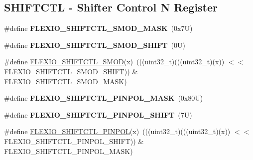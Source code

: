 \subsection*{S\+H\+I\+F\+T\+C\+TL -\/ Shifter Control N Register}
\begin{DoxyCompactItemize}
\item 
\mbox{\label{group___f_l_e_x_i_o___register___masks_ga7585d1e553b36c88156cba2bcfd17c80}} 
\#define {\bfseries F\+L\+E\+X\+I\+O\+\_\+\+S\+H\+I\+F\+T\+C\+T\+L\+\_\+\+S\+M\+O\+D\+\_\+\+M\+A\+SK}~(0x7\+U)
\item 
\mbox{\label{group___f_l_e_x_i_o___register___masks_ga18bd719621dccd6e0e31ea3ae2aca7ca}} 
\#define {\bfseries F\+L\+E\+X\+I\+O\+\_\+\+S\+H\+I\+F\+T\+C\+T\+L\+\_\+\+S\+M\+O\+D\+\_\+\+S\+H\+I\+FT}~(0\+U)
\item 
\#define \mbox{\hyperlink{group___f_l_e_x_i_o___register___masks_ga14f485b51d813cb04f0e539ed4eb1781}{F\+L\+E\+X\+I\+O\+\_\+\+S\+H\+I\+F\+T\+C\+T\+L\+\_\+\+S\+M\+OD}}(x)~(((uint32\+\_\+t)(((uint32\+\_\+t)(x)) $<$$<$ F\+L\+E\+X\+I\+O\+\_\+\+S\+H\+I\+F\+T\+C\+T\+L\+\_\+\+S\+M\+O\+D\+\_\+\+S\+H\+I\+FT)) \& F\+L\+E\+X\+I\+O\+\_\+\+S\+H\+I\+F\+T\+C\+T\+L\+\_\+\+S\+M\+O\+D\+\_\+\+M\+A\+SK)
\item 
\mbox{\label{group___f_l_e_x_i_o___register___masks_gacda2967894dd3ed8920dffbc5f6b2548}} 
\#define {\bfseries F\+L\+E\+X\+I\+O\+\_\+\+S\+H\+I\+F\+T\+C\+T\+L\+\_\+\+P\+I\+N\+P\+O\+L\+\_\+\+M\+A\+SK}~(0x80\+U)
\item 
\mbox{\label{group___f_l_e_x_i_o___register___masks_gaccdf99b16a81b2677dd8b6b312b01ee5}} 
\#define {\bfseries F\+L\+E\+X\+I\+O\+\_\+\+S\+H\+I\+F\+T\+C\+T\+L\+\_\+\+P\+I\+N\+P\+O\+L\+\_\+\+S\+H\+I\+FT}~(7\+U)
\item 
\#define \mbox{\hyperlink{group___f_l_e_x_i_o___register___masks_ga3620f37cc88b910368819ac876b5eacd}{F\+L\+E\+X\+I\+O\+\_\+\+S\+H\+I\+F\+T\+C\+T\+L\+\_\+\+P\+I\+N\+P\+OL}}(x)~(((uint32\+\_\+t)(((uint32\+\_\+t)(x)) $<$$<$ F\+L\+E\+X\+I\+O\+\_\+\+S\+H\+I\+F\+T\+C\+T\+L\+\_\+\+P\+I\+N\+P\+O\+L\+\_\+\+S\+H\+I\+FT)) \& F\+L\+E\+X\+I\+O\+\_\+\+S\+H\+I\+F\+T\+C\+T\+L\+\_\+\+P\+I\+N\+P\+O\+L\+\_\+\+M\+A\+SK)
\item 
\mbox{\label{group___f_l_e_x_i_o___register___masks_gaca42c9973e949c9a7e6bea92e4e033f0}} 

\end{DoxyCompactItemize}
